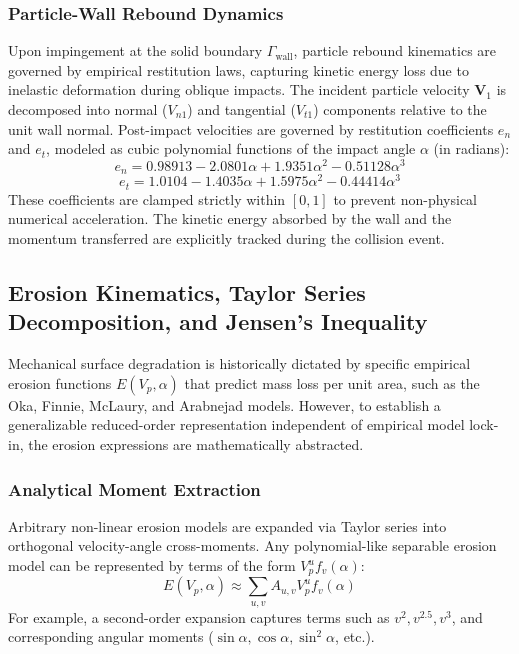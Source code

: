 \documentclass{article}
\begin{document}
\subsubsection{Particle-Wall Rebound Dynamics}
Upon impingement at the solid boundary $\Gamma_{\text{wall}}$, particle rebound kinematics are governed by empirical restitution laws, capturing kinetic energy loss due to inelastic deformation during oblique impacts. The incident particle velocity $\mathbf{V}_1$ is decomposed into normal ($V_{n1}$) and tangential ($V_{t1}$) components relative to the unit wall normal. Post-impact velocities are governed by restitution coefficients $e_n$ and $e_t$, modeled as cubic polynomial functions of the impact angle $\alpha$ (in radians):
\begin{equation}
    e_n = 0.98913 - 2.0801\alpha + 1.9351\alpha^2 - 0.51128\alpha^3
\end{equation}
\begin{equation}
    e_t = 1.0104 - 1.4035\alpha + 1.5975\alpha^2 - 0.44414\alpha^3
\end{equation}
These coefficients are clamped strictly within $[0, 1]$ to prevent non-physical numerical acceleration. The kinetic energy absorbed by the wall and the momentum transferred are explicitly tracked during the collision event.

\subsection{Erosion Kinematics, Taylor Series Decomposition, and Jensen's Inequality}
\label{sec:erosion_kinematics}

Mechanical surface degradation is historically dictated by specific empirical erosion functions $E(V_p, \alpha)$ that predict mass loss per unit area, such as the Oka, Finnie, McLaury, and Arabnejad models. However, to establish a generalizable reduced-order representation independent of empirical model lock-in, the erosion expressions are mathematically abstracted.

\subsubsection{Analytical Moment Extraction}
Arbitrary non-linear erosion models are expanded via Taylor series into orthogonal velocity-angle cross-moments. Any polynomial-like separable erosion model can be represented by terms of the form $V_p^u f_v(\alpha)$:
\begin{equation}
    E(V_p, \alpha) \approx \sum_{u, v} A_{u,v} V_p^u f_v(\alpha)
\end{equation}
For example, a second-order expansion captures terms such as $v^2, v^{2.5}, v^3$, and corresponding angular moments ($\sin\alpha, \cos\alpha, \sin^2\alpha$, etc.).
\end{document}

